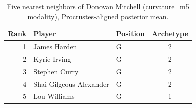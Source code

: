 \begin{table}[htbp]
  \centering\small
  \begin{tabular}{rllc}
    \toprule
    Rank & Player & Position & Archetype \\
    \midrule
    1 & James Harden & G & 2 \\
    2 & Kyrie Irving & G & 2 \\
    3 & Stephen Curry & G & 2 \\
    4 & Shai Gilgeous-Alexander & G & 2 \\
    5 & Lou Williams & G & 1 \\
    \bottomrule
  \end{tabular}
  \caption{Five nearest neighbors of Donovan Mitchell (curvature_m5 modality), Procrustes-aligned posterior mean.}
  \label{tab:Donovan_Mitchell_neighbors_curvature_m5}
\end{table}

